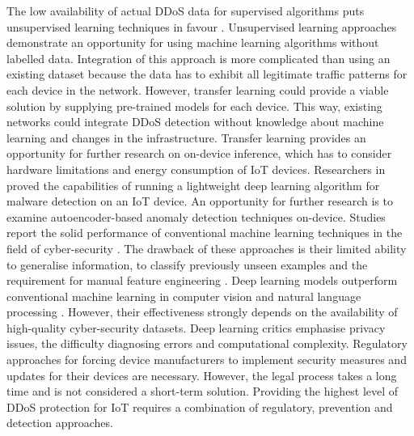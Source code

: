 \documentclass[conference, 11pt]{IEEEtran}
\begin{document}
    The low availability of actual DDoS data for supervised algorithms puts unsupervised learning techniques in favour \cite{xin2018machine}.
    Unsupervised learning approaches demonstrate an opportunity for using machine learning algorithms without labelled data.
    Integration of this approach is more complicated than using an existing dataset because the data has to exhibit all legitimate traffic patterns for each device in the network.
    However, transfer learning could provide a viable solution by supplying pre-trained models for each device.
    This way, existing networks could integrate DDoS detection without knowledge about machine learning and changes in the infrastructure.
    Transfer learning provides an opportunity for further research on on-device inference, which has to consider hardware limitations and energy consumption of IoT devices.
    Researchers in \cite{article:3} proved the capabilities of running a lightweight deep learning algorithm for malware detection on an IoT device.
    An opportunity for further research is to examine autoencoder-based anomaly detection techniques on-device.
    Studies report the solid performance of conventional machine learning techniques in the field of cyber-security \cite{xin2018machine}.
    The drawback of these approaches is their limited ability to generalise information, to classify previously unseen examples and the requirement for manual feature engineering \cite{Goodfellow-et-al-2016}.
    Deep learning models outperform conventional machine learning in computer vision and natural language processing \cite{Goodfellow-et-al-2016}.
    However, their effectiveness strongly depends on the availability of high-quality cyber-security datasets.
    Deep learning critics emphasise privacy issues, the difficulty diagnosing errors and computational complexity.
    Regulatory approaches for forcing device manufacturers to implement security measures and updates for their devices are necessary.
    However, the legal process takes a long time and is not considered a short-term solution.
    Providing the highest level of DDoS protection for IoT requires a combination of regulatory, prevention and detection approaches.
\end{document}
